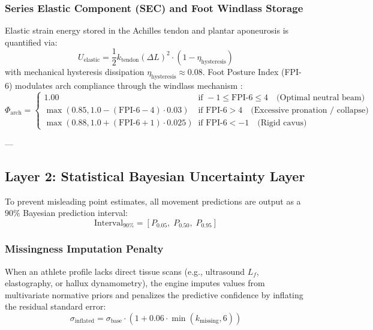 \documentclass[11pt,a4paper]{article}
\begin{document}
\subsubsection{Series Elastic Component (SEC) and Foot Windlass Storage}
Elastic strain energy stored in the Achilles tendon and plantar aponeurosis is quantified via:
\begin{equation}
    U_{\text{elastic}} = \frac{1}{2} k_{\text{tendon}} (\Delta L)^2 \cdot (1 - \eta_{\text{hysteresis}})
\end{equation}
with mechanical hysteresis dissipation $\eta_{\text{hysteresis}} \approx 0.08$. Foot Posture Index (FPI-6) modulates arch compliance through the windlass mechanism \cite{farris2019}:
\begin{equation}
    \Phi_{\text{arch}} = 
    \begin{cases} 
        1.00 & \text{if } -1 \le \text{FPI-6} \le 4 \quad \text{(Optimal neutral beam)} \\
        \max(0.85, 1.0 - (\text{FPI-6} - 4) \cdot 0.03) & \text{if } \text{FPI-6} > 4 \quad \text{(Excessive pronation / collapse)} \\
        \max(0.88, 1.0 + (\text{FPI-6} + 1) \cdot 0.025) & \text{if } \text{FPI-6} < -1 \quad \text{(Rigid cavus)}
    \end{cases}
\end{equation}

---

\subsection{Layer 2: Statistical Bayesian Uncertainty Layer}

To prevent misleading point estimates, all movement predictions are output as a $90\%$ Bayesian prediction interval:
\begin{equation}
    \text{Interval}_{90\%} = [P_{0.05}, \; P_{0.50}, \; P_{0.95}]
\end{equation}

\subsubsection{Missingness Imputation Penalty}
When an athlete profile lacks direct tissue scans (e.g., ultrasound $L_f$, elastography, or hallux dynamometry), the engine imputes values from multivariate normative priors and penalizes the predictive confidence by inflating the residual standard error:
\begin{equation}
    \sigma_{\text{inflated}} = \sigma_{\text{base}} \cdot \left(1 + 0.06 \cdot \min(k_{\text{missing}}, 6)\right)
\end{equation}
\end{document}
